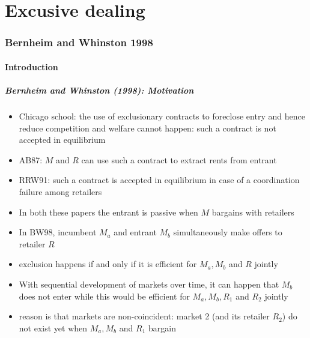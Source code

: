 \documentclass[11pt,english]{beamer}
\begin{document}
\part[lecture 5]{Excusive dealing}


\section{Bernheim and Whinston 1998}

\subsection{Introduction}

\begin{frame}[allowframebreaks]\frametitle{Bernheim and Whinston
    (1998): Motivation}
  \begin{itemize}
  \item Chicago school: the use of exclusionary contracts to foreclose
    entry and hence reduce competition and welfare cannot happen: such
    a contract is not accepted in equilibrium
  \item AB87: $M$ and $R$ can use such a contract to extract rents
    from entrant
  \item RRW91: such a contract is accepted in equilibrium in case of a
    coordination failure among retailers
  \item In both these papers the entrant is passive when $M$ bargains
    with retailers
  \item In BW98,  incumbent $M_a$ and entrant $M_b$ simultaneously
    make offers to retailer $R$
  \item exclusion happens if and only if it is efficient for $M_a,M_b$
    and $R$ jointly
  \item With sequential development of markets over time, it can
    happen that $M_b$ does not enter while this would be efficient for
    $M_a,M_b,R_1$ and $R_2$ jointly
  \item reason is that markets are non-coincident: market 2 (and its
    retailer $R_2$) do not exist yet when $M_a,M_b$ and $R_1$ bargain
  \end{itemize}
\end{frame}
\end{document}
